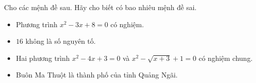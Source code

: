 \begin{ex}
Cho các mệnh đề sau. Hãy cho biết có bao nhiêu mệnh đề sai.
\begin{itemize}
\item Phương trình $x^2-3x+8=0$ có nghiệm.
\item $16$ không là số nguyên tố.
\item Hai phương trình $x^2-4x+3=0$ và $x^2-\sqrt{x+3}+1=0$ có nghiệm chung.
\item Buôn Ma Thuột là thành phố của tỉnh Quảng Ngãi.
\end{itemize}
\end{ex}
